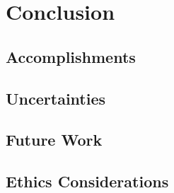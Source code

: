 \section{Conclusion}

\subsection{Accomplishments}
\subsection{Uncertainties}
\subsection{Future Work}
\subsection{Ethics Considerations}